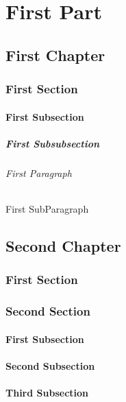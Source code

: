 \documentclass{book}
\begin{document}
\part{First Part}
\chapter{First Chapter}
\section{First Section}
\subsection{First Subsection}
\subsubsection{First Subsubsection}
\paragraph{First Paragraph}
\subparagraph{First SubParagraph}
\chapter{Second Chapter}
\section{First Section}
\section{Second Section}
\subsection{First Subsection}
\subsection{Second Subsection}
\subsection{Third Subsection}
\end{document}
